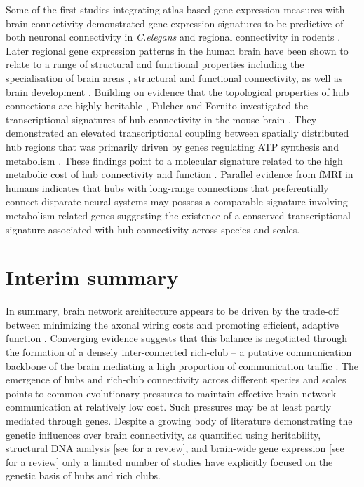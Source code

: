 Some of the first studies integrating atlas-based gene expression measures with brain connectivity demonstrated gene expression signatures to be predictive of both neuronal connectivity in \textit{C.elegans}
\citep{Kaufman2006} and regional connectivity in rodents \citep{Fakhry2015,Fakhry2015a,Ji2014}. Later regional gene expression patterns in the human brain have been shown to relate to a range of structural and functional properties including the specialisation of brain areas \citep{Anderson2018,Krienen2016,Parkes2017}, structural
\citep{Goel2014} and functional \citep{Cioli2014b,Forest2017,Richiardi2015,Vertes2016b} connectivity, as well as brain development \citep{Kirsch2016a,Whitaker2016a}. Building on evidence that the topological properties of hub connections are highly heritable \citep{Fornito2011}, Fulcher and Fornito investigated the transcriptional signatures of hub connectivity in the mouse brain \citep{Fulcher2016}. They demonstrated an elevated transcriptional coupling between spatially distributed hub regions that was primarily driven by genes regulating ATP synthesis and metabolism \citep{Fulcher2016}. These findings point to a molecular signature related to the high metabolic cost of hub connectivity and function \citep{Liang2013a,Tomasi2013}. Parallel evidence from fMRI in humans indicates that hubs with long-range connections that preferentially connect disparate neural systems may possess a comparable signature involving metabolism-related genes \citep{Vertes2016b} suggesting the existence of a conserved transcriptional signature associated with hub connectivity across species and scales. 

\section{Interim summary}

In summary, brain network architecture appears to be driven by the trade-off between minimizing the axonal wiring costs and promoting efficient, adaptive function \citep{Bullmore2012}. Converging evidence suggests that this balance is negotiated through the formation of a densely inter-connected rich-club – a putative communication backbone of the brain mediating a high proportion of communication traffic \citep{VandenHeuvel2011}. The emergence of hubs and rich-club connectivity across different species and scales points to common evolutionary pressures to maintain effective brain network communication at relatively low cost. Such pressures may be at least partly mediated through genes. Despite a growing body of literature demonstrating the genetic influences over brain connectivity, as quantified using heritability, structural DNA analysis [see \citet{Thompson2013} for a review], and brain-wide gene expression [see \citet{Fornito2019} for a review] only a limited number of studies have explicitly focused on the genetic basis of hubs and rich clubs. 

